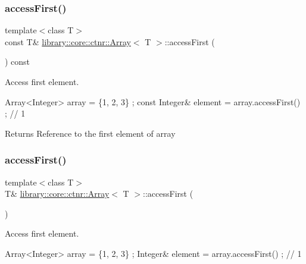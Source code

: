 \subsubsection{\texorpdfstring{access\+First()}{accessFirst()}\hspace{0.1cm}{\footnotesize\ttfamily [1/2]}}
{\footnotesize\ttfamily template$<$class T$>$ \\
const T\& \hyperlink{classlibrary_1_1core_1_1ctnr_1_1_array}{library\+::core\+::ctnr\+::\+Array}$<$ T $>$\+::access\+First (\begin{DoxyParamCaption}{ }\end{DoxyParamCaption}) const}



Access first element. 


\begin{DoxyCode}
Array<Integer> array = \{1, 2, 3\} ;
\textcolor{keyword}{const} Integer& element = array.accessFirst() ; \textcolor{comment}{// 1}
\end{DoxyCode}


\begin{DoxyReturn}{Returns}
Reference to the first element of array 
\end{DoxyReturn}
\mbox{\label{classlibrary_1_1core_1_1ctnr_1_1_array_abb2068e46720e8df057b5410ac8879d5}} 
\subsubsection{\texorpdfstring{access\+First()}{accessFirst()}\hspace{0.1cm}{\footnotesize\ttfamily [2/2]}}
{\footnotesize\ttfamily template$<$class T$>$ \\
T\& \hyperlink{classlibrary_1_1core_1_1ctnr_1_1_array}{library\+::core\+::ctnr\+::\+Array}$<$ T $>$\+::access\+First (\begin{DoxyParamCaption}{ }\end{DoxyParamCaption})}



Access first element. 


\begin{DoxyCode}
Array<Integer> array = \{1, 2, 3\} ;
Integer& element = array.accessFirst() ; \textcolor{comment}{// 1}
\end{DoxyCode}


